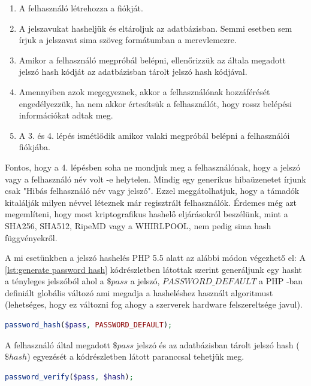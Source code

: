 \documentclass[12pt]{report}
\theoremstyle{definition}
\begin{document}
	\begin{enumerate}
		\item A felhasználó létrehozza a fiókját.
		\item A jelszavukat hasheljük és eltároljuk az adatbázisban. Semmi esetben sem írjuk a jelszavat sima szöveg formátumban a merevlemezre.
		\item Amikor a felhasználó megpróbál belépni, ellenőrizzük az általa megadott jelszó hash kódját az adatbázisban tárolt jelszó hash kódjával.
		\item Amennyiben azok megegyeznek, akkor a felhasználónak hozzáférését engedélyezzük, ha nem akkor értesítsük a felhasználót, hogy rossz belépési információkat adtak meg.
		\item A 3. és 4. lépés ismétlődik amikor valaki megpróbál belépni a felhasználói fiókjába.  
	\end{enumerate}
	
	Fontos, hogy a 4. lépésben soha ne mondjuk meg a felhasználónak, hogy a jelszó vagy a felhasználó név volt -e helytelen. Mindig egy generikus hibaüzenetet írjunk csak "Hibás felhasználó név vagy jelszó". Ezzel meggátolhatjuk, hogy a támadók kitalálják milyen névvel léteznek már regisztrált felhasználók. Érdemes még azt megemlíteni, hogy most kriptografikus hashelő eljárásokról beszélünk, mint a SHA256, SHA512, RipeMD vagy a WHIRLPOOL, nem pedig sima hash függvényekről.
	
	A mi esetünkben a jelszó hashelés PHP 5.5 alatt az alábbi módon végezhető el: A \ref{lst:generate password hash} kódrészletben látottak szerint generáljunk egy hasht a tényleges jelszóból ahol a $\$pass$ a jelszó, $PASSWORD\_DEFAULT$ a PHP -ban definiált globális változó ami megadja a hasheléshez használt algoritmust (lehetséges, hogy ez változni fog ahogy a szerverek hardware felszereltsége javul).
	
	\noindent\begin{minipage}{\linewidth}
		\begin{lstlisting}[language=php,label={lst:generate password hash}, caption={Jelszó hash generálás PHP 5.5 alatt}]
password_hash($pass, PASSWORD_DEFAULT);
		\end{lstlisting}
	\end{minipage}
	
	A felhasználó által megadott $\$pass$ jelszó és az adatbázisban tárolt jelszó hash ($\$hash$) egyezését a kódrészletben látott paranccsal tehetjük meg.
	
	\noindent\begin{minipage}{\linewidth}
		\begin{lstlisting}[language=php,label={lst:verify password hash}, caption={Jelszó hash verifikálása PHP 5.5 alatt}]
password_verify($pass, $hash);
		\end{lstlisting}
	\end{minipage}
	
\end{document}
